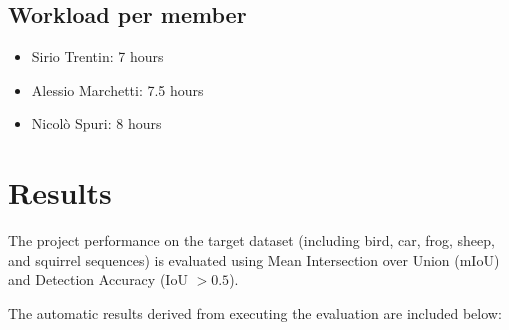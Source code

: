 \documentclass[a4paper,11pt]{article}
\begin{document}
\subsection{Workload per member}
\begin{itemize}
    \item Sirio Trentin: 7 hours
    \item Alessio Marchetti: 7.5 hours 
    \item Nicolò Spuri: 8 hours
\end{itemize}

\section{Results}
The project performance on the target dataset (including bird, car, frog, sheep, and squirrel sequences) is evaluated using Mean Intersection over Union (mIoU) and Detection Accuracy (IoU $> 0.5$). 

The automatic results derived from executing the evaluation are included below:


\end{document}
